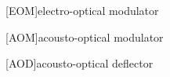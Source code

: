 \begin{acronym}
[EOM]{electro-optical modulator}
\end{acronym}

\begin{acronym}
[AOM]{acousto-optical modulator}
\end{acronym}

\begin{acronym}
[AOD]{acousto-optical deflector}
\end{acronym}
